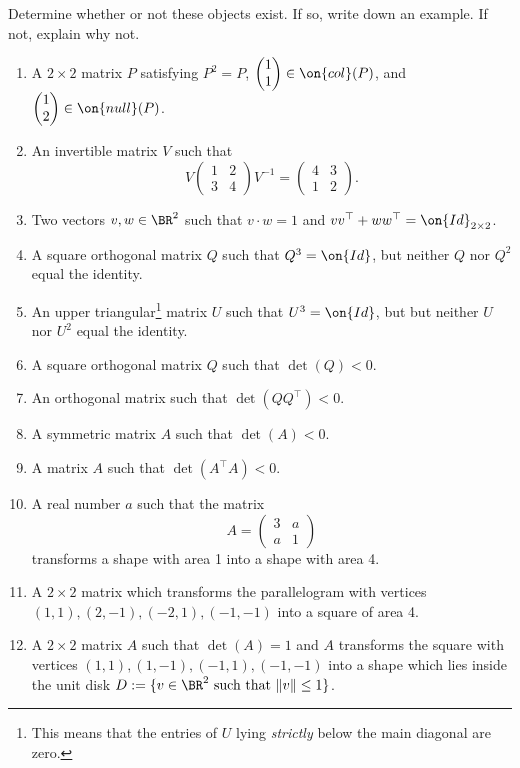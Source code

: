 \documentclass[10pt]{amsart}
\theoremstyle{mythm}
\theoremstyle{definition}
\theoremstyle{myrmk}
\newcounter{part-count}
\newenvironment{me}[1]{\begin{enumerate}[#1]\setcounter{enumi}{\value{part-count}}}{\setcounter{part-count}{\value{enumi}}\end{enumerate}}
\begin{document}
	\thispagestyle{fancy}
	
	\noindent Determine whether or not these objects exist. If so, write down an example. If not, explain why not. 
	
	\begin{me}{itemsep = 0.2cm}
		\item A $2 \times 2$ matrix $P$ satisfying $P^2 = P$, $\begin{pmatrix}
		1 \\ 1 
		\end{pmatrix} \in \on{col}(P)$, and $\begin{pmatrix}
		1 \\ 2
		\end{pmatrix} \in \on{null}(P)$. 
		\item An invertible matrix $V$ such that 
		\[
			V \begin{pmatrix}
			1 & 2 \\ 3 & 4 
			\end{pmatrix} V^{-1} = \begin{pmatrix}
			4 & 3 \\ 1 & 2
			\end{pmatrix}. 
		\]
		\item Two vectors $v, w \in \BR^2$ such that $v \cdot w = 1$ and $vv^\top + ww^\top = \on{Id}_{2 \times 2}$. 
		\item A square orthogonal matrix $Q$ such that $Q^3 = \on{Id}$, but neither $Q$ nor $Q^2$ equal the identity. 
		\item An upper triangular\footnote{This means that the entries of $U$ lying \emph{strictly} below the main diagonal are zero.} matrix $U$ such that $U^3 = \on{Id}$, but but neither $U$ nor $U^2$ equal the identity. 
		\item A square orthogonal matrix $Q$ such that $\det(Q) < 0$. 
		\item An orthogonal matrix such that $\det(QQ^\top) < 0$. 
		\item A symmetric matrix $A$ such that $\det(A) < 0$. 
		\item A matrix $A$ such that $\det(A^\top A) < 0$. 
		\item A real number $a$ such that the matrix 
		\[
			A = \begin{pmatrix}
			3 & a \\
			a & 1
			\end{pmatrix}
		\]
		transforms a shape with area 1 into a shape with area 4. 
		\item A $2 \times 2$ matrix which transforms the parallelogram with vertices $(1, 1), (2, -1), (-2, 1), (-1, -1)$ into a square of area 4. 
		\item A $2 \times 2$ matrix $A$ such that $\det(A) = 1$ and $A$ transforms the square with vertices $(1, 1), (1, -1), (-1, 1), (-1, -1)$ into a shape which lies inside the unit disk $D := \{v \in \BR^2 \text{ such that } \lVert v \rVert \le 1\}$. 
	\end{me}
	
\end{document}
